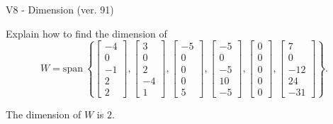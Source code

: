 \begin{exercise}
  \begin{exerciseTitle}V8 - Dimension (ver. 91)\end{exerciseTitle}
  \begin{exerciseStatement}
    Explain how to find the dimension of 
\[W=\mathrm{span}\ \left\{\left[\begin{array}{r}
-4 \\
0 \\
-1 \\
2 \\
2
\end{array}\right] , \left[\begin{array}{r}
3 \\
0 \\
2 \\
-4 \\
1
\end{array}\right] , \left[\begin{array}{r}
-5 \\
0 \\
0 \\
0 \\
5
\end{array}\right] , \left[\begin{array}{r}
-5 \\
0 \\
-5 \\
10 \\
-5
\end{array}\right] , \left[\begin{array}{r}
0 \\
0 \\
0 \\
0 \\
0
\end{array}\right] , \left[\begin{array}{r}
7 \\
0 \\
-12 \\
24 \\
-31
\end{array}\right]\right\}.\]



  \end{exerciseStatement}
  \begin{exerciseAnswer}
   The dimension of \(W\) is  \(2\).
  


  \end{exerciseAnswer}
\end{exercise}